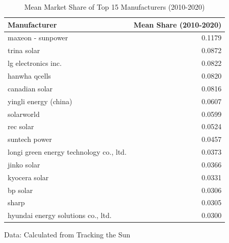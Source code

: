 \begin{table}[!t]
\caption*{
{\large Mean Market Share of Top 15 Manufacturers (2010-2020)}
} 
\fontsize{12.0pt}{14.4pt}\selectfont
\begin{tabular*}{\linewidth}{@{\extracolsep{\fill}}lr}
\toprule
Manufacturer & Mean Share (2010-2020) \\ 
\midrule\addlinespace[2.5pt]
maxeon - sunpower & 0.1179 \\ 
trina solar & 0.0872 \\ 
lg electronics inc. & 0.0822 \\ 
hanwha qcells & 0.0820 \\ 
canadian solar & 0.0816 \\ 
yingli energy (china) & 0.0607 \\ 
solarworld & 0.0599 \\ 
rec solar & 0.0524 \\ 
suntech power & 0.0457 \\ 
longi green energy technology co., ltd. & 0.0373 \\ 
jinko solar & 0.0366 \\ 
kyocera solar & 0.0331 \\ 
bp solar & 0.0306 \\ 
sharp & 0.0305 \\ 
hyundai energy solutions co., ltd. & 0.0300 \\ 
\bottomrule
\end{tabular*}
\begin{minipage}{\linewidth}
Data: Calculated from Tracking the Sun\\
\end{minipage}
\end{table}

